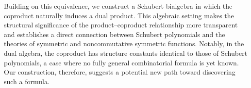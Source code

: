\documentclass{amsart}
\theoremstyle{definition}
\theoremstyle{remark}
\numberwithin{equation}{subsection}
\begin{document}
Building on this equivalence, we construct a Schubert bialgebra in which the coproduct naturally induces a dual product. This algebraic setting makes the structural significance of the product--coproduct relationship more transparent and establishes a direct connection between Schubert polynomials and the theories of symmetric and noncommutative symmetric functions. Notably, in the dual algebra, the coproduct has structure constants identical to those of Schubert polynomials, a case where no fully general combinatorial formula is yet known. Our construction, therefore, suggests a potential new path toward discovering such a formula.

\end{document}
